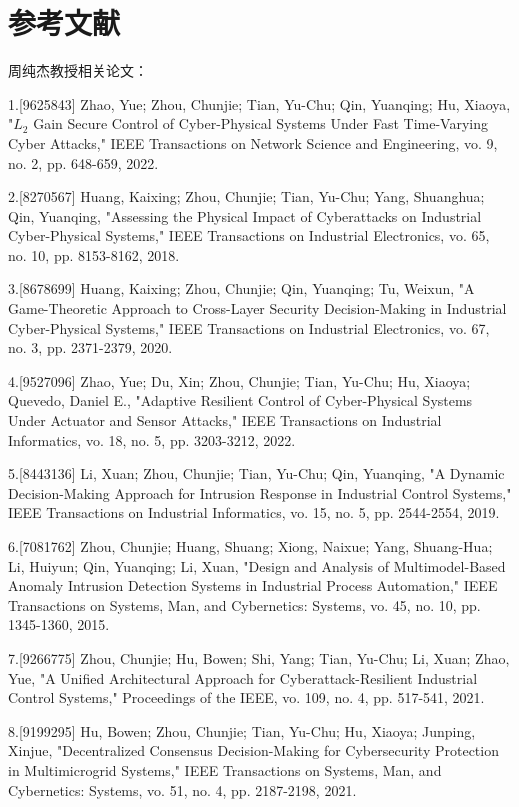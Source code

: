\section{参考文献}

周纯杰教授相关论文： 

1.[9625843] Zhao, Yue; Zhou, Chunjie; Tian, Yu-Chu; Qin, Yuanqing; Hu, Xiaoya, "$L_2$ Gain Secure Control of Cyber-Physical Systems Under Fast Time-Varying Cyber Attacks," IEEE Transactions on Network Science and Engineering, vo. 9, no. 2, pp. 648-659, 2022.

2.[8270567] Huang, Kaixing; Zhou, Chunjie; Tian, Yu-Chu; Yang, Shuanghua; Qin, Yuanqing, "Assessing the Physical Impact of Cyberattacks on Industrial Cyber-Physical Systems," IEEE Transactions on Industrial Electronics, vo. 65, no. 10, pp. 8153-8162, 2018.

3.[8678699] Huang, Kaixing; Zhou, Chunjie; Qin, Yuanqing; Tu, Weixun, "A Game-Theoretic Approach to Cross-Layer Security Decision-Making in Industrial Cyber-Physical Systems," IEEE Transactions on Industrial Electronics, vo. 67, no. 3, pp. 2371-2379, 2020.


4.[9527096] Zhao, Yue; Du, Xin; Zhou, Chunjie; Tian, Yu-Chu; Hu, Xiaoya; Quevedo, Daniel E., "Adaptive Resilient Control of Cyber-Physical Systems Under Actuator and Sensor Attacks," IEEE Transactions on Industrial Informatics, vo. 18, no. 5, pp. 3203-3212, 2022.

5.[8443136] Li, Xuan; Zhou, Chunjie; Tian, Yu-Chu; Qin, Yuanqing, "A Dynamic Decision-Making Approach for Intrusion Response in Industrial Control Systems," IEEE Transactions on Industrial Informatics, vo. 15, no. 5, pp. 2544-2554, 2019.

6.[7081762] Zhou, Chunjie; Huang, Shuang; Xiong, Naixue; Yang, Shuang-Hua; Li, Huiyun; Qin, Yuanqing; Li, Xuan, "Design and Analysis of Multimodel-Based Anomaly Intrusion Detection Systems in Industrial Process Automation," IEEE Transactions on Systems, Man, and Cybernetics: Systems, vo. 45, no. 10, pp. 1345-1360, 2015.

7.[9266775] Zhou, Chunjie; Hu, Bowen; Shi, Yang; Tian, Yu-Chu; Li, Xuan; Zhao, Yue, "A Unified Architectural Approach for Cyberattack-Resilient Industrial Control Systems," Proceedings of the IEEE, vo. 109, no. 4, pp. 517-541, 2021.

8.[9199295] Hu, Bowen; Zhou, Chunjie; Tian, Yu-Chu; Hu, Xiaoya; Junping, Xinjue, "Decentralized Consensus Decision-Making for Cybersecurity Protection in Multimicrogrid Systems," IEEE Transactions on Systems, Man, and Cybernetics: Systems, vo. 51, no. 4, pp. 2187-2198, 2021.

